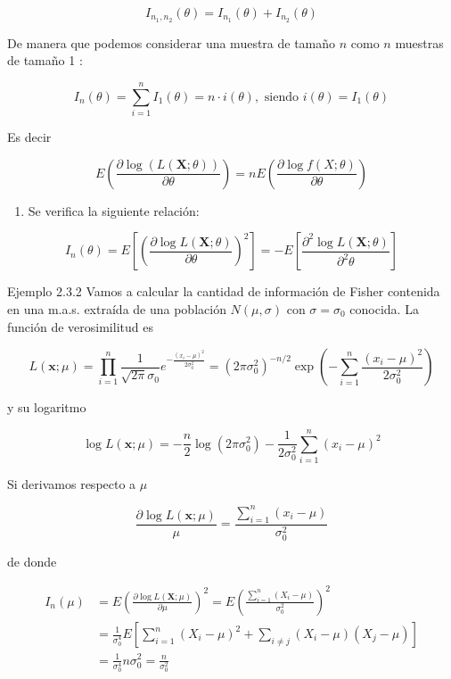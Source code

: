 \documentclass[
]{article}
\providecommand{\tightlist}{%
  \setlength{\itemsep}{0pt}\setlength{\parskip}{0pt}}
\begin{document}
\[
I_{n_{1}, n_{2}}(\theta)=I_{n_{1}}(\theta)+I_{n_{2}}(\theta)
\]

De manera que podemos considerar una muestra de tamaño \(n\) como \(n\) muestras de tamaño 1 :

\[
I_{n}(\theta)=\sum_{i=1}^{n} I_{1}(\theta)=n \cdot i(\theta), \text { siendo } i(\theta)=I_{1}(\theta)
\]

Es decir

\[
E\left(\frac{\partial \log (L(\mathbf{X} ; \theta))}{\partial \theta}\right)=n E\left(\frac{\partial \log f(X ; \theta)}{\partial \theta}\right)
\]

\begin{enumerate}
\def\labelenumi{\arabic{enumi}.}
\setcounter{enumi}{3}
\tightlist
\item
  Se verifica la siguiente relación:
\end{enumerate}

\[
I_{n}(\theta)=E\left[\left(\frac{\partial \log L(\mathbf{X} ; \theta)}{\partial \theta}\right)^{2}\right]=-E\left[\frac{\partial^{2} \log L(\mathbf{X} ; \theta)}{\partial^{2} \theta}\right]
\]

Ejemplo 2.3.2 Vamos a calcular la cantidad de información de Fisher contenida en una m.a.s. extraída de una población \(N(\mu, \sigma)\) con \(\sigma=\sigma_{0}\) conocida. La función de verosimilitud es

\[
L(\mathbf{x} ; \mu)=\prod_{i=1}^{n} \frac{1}{\sqrt{2 \pi} \sigma_{0}} e^{-\frac{\left(x_{i}-\mu\right)^{2}}{2 \sigma_{0}^{2}}}=\left(2 \pi \sigma_{0}^{2}\right)^{-n / 2} \exp \left(-\sum_{i=1}^{n} \frac{\left(x_{i}-\mu\right)^{2}}{2 \sigma_{0}^{2}}\right)
\]

y su logaritmo

\[
\log L(\mathbf{x} ; \mu)=-\frac{n}{2} \log \left(2 \pi \sigma_{0}^{2}\right)-\frac{1}{2 \sigma_{0}^{2}} \sum_{i=1}^{n}\left(x_{i}-\mu\right)^{2}
\]

Si derivamos respecto a \(\mu\)

\[
\frac{\partial \log L(\mathbf{x} ; \mu)}{\mu}=\frac{\sum_{i=1}^{n}\left(x_{i}-\mu\right)}{\sigma_{0}^{2}}
\]

de donde

\[
\begin{aligned}
I_{n}(\mu) & =E\left(\frac{\partial \log L(\mathbf{X} ; \mu)}{\partial \mu}\right)^{2}=E\left(\frac{\sum_{i=1}^{n}\left(X_{i}-\mu\right)}{\sigma_{0}^{2}}\right)^{2} \\
& =\frac{1}{\sigma_{0}^{4}} E\left[\sum_{i=1}^{n}\left(X_{i}-\mu\right)^{2}+\sum_{i \neq j}\left(X_{i}-\mu\right)\left(X_{j}-\mu\right)\right] \\
& =\frac{1}{\sigma_{0}^{4}} n \sigma_{0}^{2}=\frac{n}{\sigma_{0}^{2}}
\end{aligned}
\]
\end{document}
